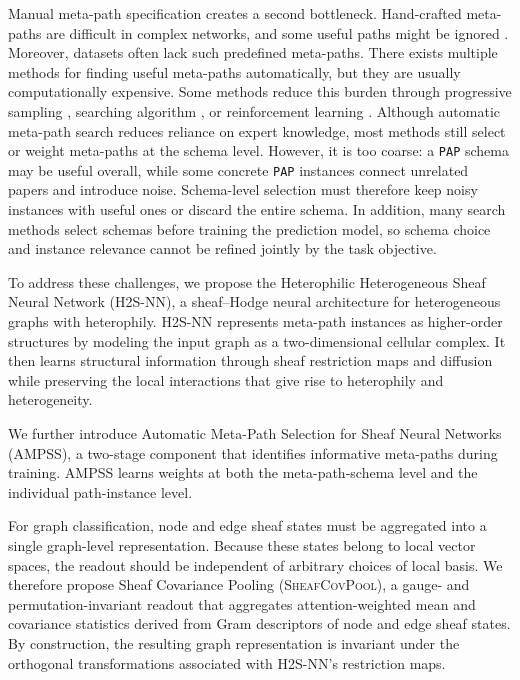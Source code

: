 \documentclass[sigconf,anonymous,review]{acmart}
\newcommand{\method}{\textsc{H2S-NN}}
\newcommand{\ampss}{\textsc{AMPSS}}
\newcommand{\sheafcovpool}{\textsc{SheafCovPool}}
\begin{document}
Manual meta-path specification creates a second bottleneck. Hand-crafted meta-paths are difficult in complex networks, and some useful paths might be ignored \cite{zhong2022pmhgnn,li2024lmsps}. Moreover, datasets often lack such predefined meta-paths. There exists multiple methods for finding useful meta-paths automatically, but they are usually computationally expensive. Some
methods reduce this burden through progressive sampling \cite{li2024lmsps}, searching algorithm \cite{zhang2026mctshgnn,li2023pmmm,li2026amphgnas,sun2025hgsearch}, or reinforcement learning
\cite{zhong2022pmhgnn}.
Although automatic meta-path search reduces reliance on expert knowledge, most methods still select or weight meta-paths at the schema level. However, it is too coarse: a \texttt{PAP} schema may be useful overall, while some concrete \texttt{PAP} instances connect unrelated papers and introduce noise. Schema-level selection must therefore keep noisy instances with useful ones or discard the entire schema. In addition, many search methods select schemas before training the prediction model, so schema choice and instance relevance cannot be refined jointly by the task objective.

To address these challenges, we propose the Heterophilic Heterogeneous Sheaf Neural Network (\method{}), a sheaf–Hodge neural architecture for heterogeneous graphs with heterophily. \method{} represents meta-path instances as higher-order structures by modeling the input graph as a two-dimensional cellular complex. It then learns structural information through sheaf restriction maps and diffusion while preserving the local interactions that give rise to heterophily and heterogeneity.

We further introduce Automatic Meta-Path Selection for Sheaf Neural Networks (\ampss{}), a two-stage component that identifies informative meta-paths during training. \ampss{} learns weights at both the meta-path-schema level and the individual path-instance level.

For graph classification, node and edge sheaf states must be aggregated into a single graph-level representation. Because these states belong to local vector spaces, the readout should be independent of arbitrary choices of local basis. We therefore propose Sheaf Covariance Pooling (\sheafcovpool{}), a gauge- and permutation-invariant readout that aggregates attention-weighted mean and covariance statistics derived from Gram descriptors of node and edge sheaf states. By construction, the resulting graph representation is invariant under the orthogonal transformations associated with \method{}'s restriction maps.
\end{document}
